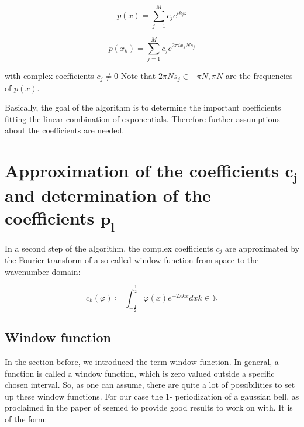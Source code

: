 \documentclass[11pt]{report} %
\begin{document}
\begin{equation}
 p(x)=\sum\limits_{j=1}^M c_{j}e^{ik_{j}z} 
\end{equation}

\begin{equation} \label{eqn: nonequi exp}
 p(x_{k})=\sum\limits_{j=1}^M c_{j}e^{2\pi ix_{k}Ns_{j}} 
\end{equation}

with complex coefficients $c_{j} \neq 0$
Note that $2 \pi Ns_j \in{-\pi N,\pi N}$ are the frequencies of $p(x)$.

Basically, the goal of the algorithm is to determine the important coefficients fitting the linear combination of exponentials.
Therefore further assumptions about the coefficients are needed.  

\section{Approximation of the coefficients $\bm{c_j}$ and determination of the coefficients $\bm{p_l}$}
In a second step of the algorithm, the complex coefficients $c_j$ are approximated by the Fourier transform of a so called window function from space to the wavenumber domain: 

\begin{equation}
c_{k} (\varphi) \coloneqq \int_{-\frac{1}{2}}^{\frac{1}{2}} \varphi (x) e^{-2 \pi kx} dx         
k \in \mathbb{N}
\end{equation}

\subsection{Window function}
In the section before, we introduced the term window function.
In general, a function is called a window function, which is zero valued outside a specific chosen interval.
So, as one can assume, there are quite a lot of possibilities to set up these window functions.
For our case the 1- periodization of a gaussian bell, as proclaimed in the paper of \cite{Peter2011} seemed to provide good results to work on with.
It is of the form: 
\end{document}
